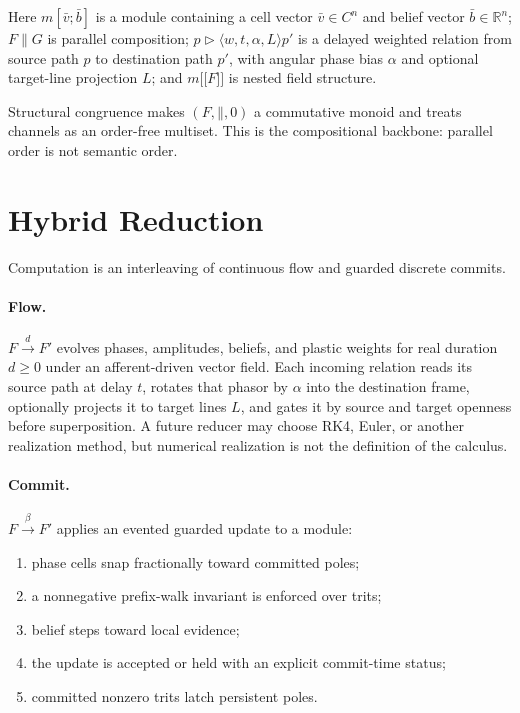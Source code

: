 \documentclass[11pt]{article}
\newcommand{\commit}{\xrightarrow{\beta}}
\newcommand{\parcomp}{\mathbin{\|}}
\newcommand{\nest}[1]{\mathopen{[\![}#1\mathclose{]\!]}}
\begin{document}
Here $m[\bar v;\bar b]$ is a module containing a cell vector $\bar v\in C^n$ and
belief vector $\bar b\in\mathbb{R}^n$; $F\parcomp G$ is parallel composition;
$p\triangleright\langle w,t,\alpha,L\rangle p'$ is a delayed weighted relation
from source path $p$ to destination path $p'$, with angular phase bias $\alpha$
and optional target-line projection $L$; and $m\nest{F}$ is nested field
structure.

Structural congruence makes $(F,\parcomp,0)$ a commutative monoid and treats
channels as an order-free multiset. This is the compositional backbone: parallel
order is not semantic order.

\section{Hybrid Reduction}

Computation is an interleaving of continuous flow and guarded discrete commits.

\paragraph{Flow.}
$F\xrightarrow{d}F'$ evolves phases, amplitudes, beliefs, and plastic weights for
real duration $d\geq 0$ under an afferent-driven vector field. Each incoming
relation reads its source path at delay $t$, rotates that phasor by $\alpha$ into
the destination frame, optionally projects it to target lines $L$, and gates it
by source and target openness before superposition. A future reducer may choose
RK4, Euler, or another realization method, but numerical realization is not the
definition of the calculus.

\paragraph{Commit.}
$F\commit F'$ applies an evented guarded update to a module:
\begin{enumerate}
\item phase cells snap fractionally toward committed poles;
\item a nonnegative prefix-walk invariant is enforced over trits;
\item belief steps toward local evidence;
\item the update is accepted or held with an explicit commit-time status;
\item committed nonzero trits latch persistent poles.
\end{enumerate}
\end{document}
